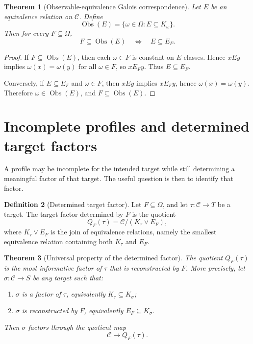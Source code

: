 \documentclass[11pt]{article}
\newtheorem{theorem}{Theorem}[section]
\theoremstyle{definition}
\newtheorem{definition}[theorem]{Definition}
\theoremstyle{remark}
\begin{document}
\begin{theorem}[Observable-equivalence Galois correspondence]
Let \(E\) be an equivalence relation on \(\mathcal C\).  Define
\[
\operatorname{Obs}(E)=\{\omega\in\Omega:E\subseteq K_\omega\}.
\]
Then for every \(F\subseteq\Omega\),
\[
F\subseteq\operatorname{Obs}(E)
\quad\Longleftrightarrow\quad
E\subseteq E_F.
\]
\end{theorem}

\begin{proof}
If \(F\subseteq\operatorname{Obs}(E)\), then each \(\omega\in F\) is constant on \(E\)-classes.  Hence \(xEy\) implies \(\omega(x)=\omega(y)\) for all \(\omega\in F\), so \(xE_Fy\).  Thus \(E\subseteq E_F\).

Conversely, if \(E\subseteq E_F\) and \(\omega\in F\), then \(xEy\) implies \(xE_Fy\), hence \(\omega(x)=\omega(y)\).  Therefore \(\omega\in\operatorname{Obs}(E)\), and \(F\subseteq\operatorname{Obs}(E)\).
\end{proof}

\section{Incomplete profiles and determined target factors}

A profile may be incomplete for the intended target while still determining a meaningful factor of that target.  The useful question is then to identify that factor.

\begin{definition}[Determined target factor]
Let \(F\subseteq\Omega\), and let \(\tau:\mathcal C\to T\) be a target.  The target factor determined by \(F\) is the quotient
\[
Q_F(\tau)=\mathcal C/(K_\tau\vee E_F),
\]
where \(K_\tau\vee E_F\) is the join of equivalence relations, namely the smallest equivalence relation containing both \(K_\tau\) and \(E_F\).
\end{definition}

\begin{theorem}[Universal property of the determined factor]
The quotient \(Q_F(\tau)\) is the most informative factor of \(\tau\) that is reconstructed by \(F\).  More precisely, let \(\sigma:\mathcal C\to S\) be any target such that:
\begin{enumerate}[label=(\alph*)]
\item \(\sigma\) is a factor of \(\tau\), equivalently \(K_\tau\subseteq K_\sigma\);
\item \(\sigma\) is reconstructed by \(F\), equivalently \(E_F\subseteq K_\sigma\).
\end{enumerate}
Then \(\sigma\) factors through the quotient map
\[
\mathcal C\to Q_F(\tau).
\]
\end{theorem}
\end{document}
